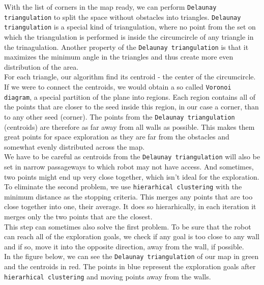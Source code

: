 \documentclass[12pt,a4paper]{article}
\begin{document}
	With the list of corners in the map ready, we can perform \texttt{Delaunay triangulation} to split the space without obstacles into triangles. \texttt{Delaunay triangulation} is a special kind of triangulation, where no point from the set on which the triangulation is performed is inside the circumcircle of any triangle in the trinagulation. Another property of the \texttt{Delaunay triangulation} is that it maximizes the minimum angle in the triangles and thus create more even distribution of the area. \\

	For each triangle, our algorithm find its centroid - the center of the circumcircle. If we were to connect the centroids, we would obtain a so called \texttt{Voronoi diagram}, a special partition of the plane into regions. Each region contains all of the points that are closer to the seed inside this region, in our case a corner, than to any other seed (corner). The points from the \texttt{Delaunay triangulation} (centroids) are therefore as far away from all walls as possible. This makes them great points for space exploration as they are far from the obstacles and somewhat evenly distributed across the map. \\

	We have to be careful as centroids from the \texttt{Delaunay triangulation} will also be set in narrow passageways to which robot may not have access. And sometimes, two points might end up very close together, which isn't ideal for the exploration. \\
	
	To eliminate the second problem, we use \texttt{hierarhical clustering} with the minimum distance as the stopping criteria. This merges any points that are too close together into one, their average. It does so hierarhically, in each iteration it merges only the two points that are the closest. \\
	
	This step can sometimes also solve the first problem. To be sure that the robot can reach all of the exploration goals, we check if any goal is too close to any wall and if so, move it into the opposite direction, away from the wall, if possible. \\

	In the figure below, we can see the \texttt{Delaunay triangulation} of our map in green and the centroids in red. The points in blue represent the exploration goals after \texttt{hierarhical clustering} and moving points away from the walls. \\
\end{document}
